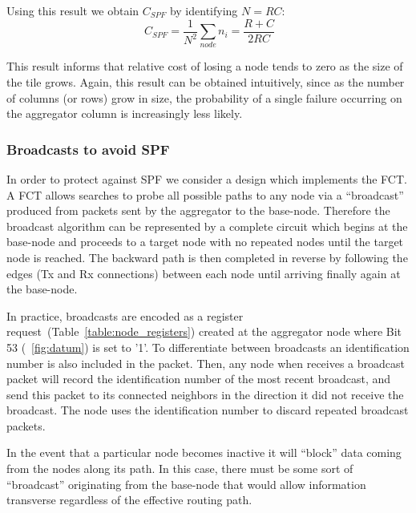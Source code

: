Using this result we obtain $C_{SPF}$ by identifying $N = RC$:
\begin{equation}~\label{eq:cspf_left_fin}
  C_{SPF} = \frac{1}{N^{2}}\sum_{node}n_{i} = \boxed{\frac{R+C}{2RC}}
\end{equation}

This result informs that relative cost of losing a node tends to zero as the size of the tile grows.
Again, this result can be obtained intuitively, since as the number of columns (or rows) grow in size, the probability of a single failure occurring on the aggregator column is increasingly less likely.

\subsubsection{Broadcasts to avoid SPF}\label{sec:broadcast}
In order to protect against SPF we consider a design which implements the FCT.
A FCT allows searches to probe all possible paths to any node via a ``broadcast'' produced from packets sent by the aggregator to the base-node.
Therefore the broadcast algorithm can be represented by a complete circuit which begins at the base-node and proceeds to a target node with no repeated nodes until the target node is reached.
The backward path is then completed in reverse by following the edges (Tx and Rx connections) between each node until arriving finally again at the base-node.

In practice, broadcasts are encoded as a register request~(Table~\ref{table:node_registers}) created at the aggregator node where Bit 53 (~\ref{fig:datum}) is set to '1'. 
To differentiate between broadcasts an identification number is also included in the packet.
Then, any node when receives a broadcast packet will record the identification number of the most recent broadcast, and send this packet to its connected neighbors in the direction it did not receive the broadcast.
The node uses the identification number to discard repeated broadcast packets.

In the event that a particular node becomes inactive it will ``block'' data coming from the nodes along its path.
In this case, there must be some sort of ``broadcast'' originating from the base-node that would allow information transverse regardless of the effective routing path.

